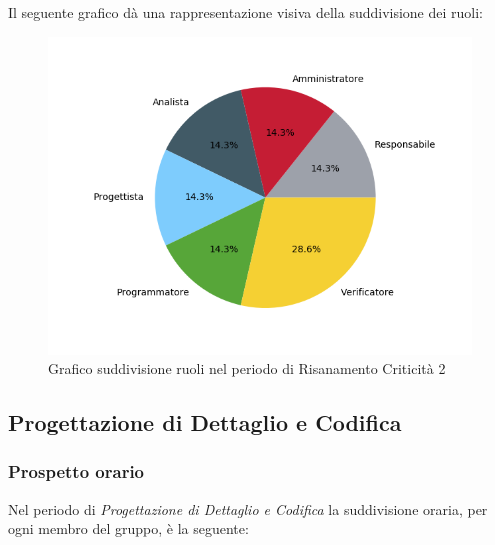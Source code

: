 Il seguente grafico dà una rappresentazione visiva della suddivisione dei ruoli:
\begin{figure}[H]
	\centering
  		\includegraphics[width=1\linewidth]{./images/torta_rc2.png}
  		\caption{Grafico suddivisione ruoli nel periodo di Risanamento Criticità 2}
  		\label{fig:grafico suddivione ruoli rc2}
\end{figure}

\newpage
\subsection{Progettazione di Dettaglio e Codifica}
\label{PPDC}
\subsubsection{Prospetto orario}

Nel periodo di \textit{Progettazione di Dettaglio e Codifica} la suddivisione oraria, per ogni membro del gruppo, è la seguente:

